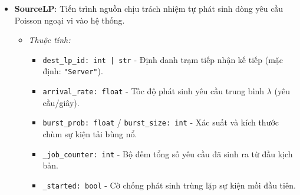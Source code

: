 \begin{itemize}[leftmargin=1.5em, itemsep=8pt]
\begin{itemize}[leftmargin=1.2em, label={}, itemsep=3pt]
\item[\textendash] \textit{Phương thức:}
\begin{itemize}[leftmargin=1.5em, label=+, itemsep=2pt]
\item \texttt{initialize(): void} / \texttt{finalize(): void} - Hook khởi tạo và chốt sổ vòng đời trạm logic.
\item \texttt{get\_local\_virt\_time(): float} - Lấy mốc thời gian ảo cục bộ hiện tại.
\item \texttt{set\_local\_virt\_time(t: float): void} - Cập nhật $LVT$, kiểm soát nghiêm ngặt ràng buộc nhân quả LCC ($t \ge LVT$).
\item \texttt{elapse\_virt\_time(delta: float): float} - Tịnh tiến $LVT$ thêm một khoảng trễ $\Delta t \ge 0$.
\item \texttt{register\_handler(event\_type, handler): void} - Đăng ký hàm callback xử lý theo loại sự kiện.
\item \texttt{send\_event(event: Event): void} - Gửi bản tin sự kiện tới trạm khác hoặc đẩy vào bộ điều phối.
\item \texttt{get\_output\_events(): List[Event]} - Trích xuất và dọn sạch danh sách sự kiện xuất xưởng.
\item \texttt{handle\_event(event: Event): void} - Tiếp nhận và kích hoạt xử lý biến cố.
\item \texttt{reset(): void} - Tái lập đồng hồ $LVT$ và hàng đợi xuất xưởng về trạng thái khởi đầu.
\end{itemize}
\end{itemize}

\item \textbf{SourceLP}: Tiến trình nguồn chịu trách nhiệm tự phát sinh dòng yêu cầu Poisson ngoại vi vào hệ thống.

\begin{itemize}[leftmargin=1.2em, label={}, itemsep=3pt]
\item[\textendash] \textit{Thuộc tính:}
\begin{itemize}[leftmargin=1.5em, label=+, itemsep=2pt]
\item \texttt{dest\_lp\_id: int | str} - Định danh trạm tiếp nhận kế tiếp (mặc định: \texttt{"Server"}).
\item \texttt{arrival\_rate: float} - Tốc độ phát sinh yêu cầu trung bình $\lambda$ (yêu cầu/giây).
\item \texttt{burst\_prob: float} / \texttt{burst\_size: int} - Xác suất và kích thước chùm sự kiện tải bùng nổ.
\item \texttt{\_job\_counter: int} - Bộ đếm tổng số yêu cầu đã sinh ra từ đầu kịch bản.
\item \texttt{\_started: bool} - Cờ chống phát sinh trùng lặp sự kiện mồi đầu tiên.
\end{itemize}


\end{itemize}
\end{itemize}
